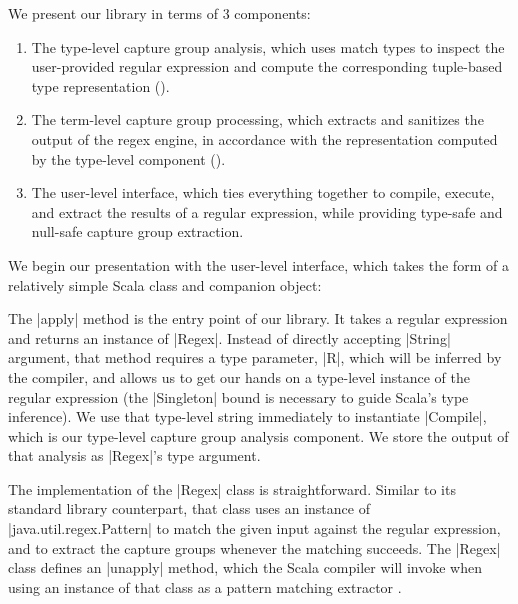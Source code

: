 We present our library in terms of 3 components:

\begin{enumerate}
  \item The type-level capture group analysis, which uses match types to inspect the user-provided regular expression and compute the corresponding tuple-based type representation ().

  \item The term-level capture group processing, which extracts and sanitizes the output of the regex engine, in accordance with the representation computed by the type-level component ().

  \item The user-level interface, which ties everything together to compile, execute, and extract the results of a regular expression, while providing type-safe and null-safe capture group extraction.
\end{enumerate}

We begin our presentation with the user-level interface, which takes the form of a relatively simple Scala class and companion object:

\regexUserLevel
%

The |apply| method is the entry point of our library.
It takes a regular expression and returns an instance of |Regex|.
Instead of directly accepting |String| argument, that method requires a type parameter, |R|, which will be inferred by the compiler, and allows us to get our hands on a type-level instance of the regular expression (the |Singleton| bound is necessary to guide Scala's type inference).
We use that type-level string immediately to instantiate |Compile|, which is our type-level capture group analysis component.
We store the output of that analysis as |Regex|'s type argument.

The implementation of the |Regex| class is straightforward.
Similar to its standard library counterpart, that class uses an instance of |java.util.regex.Pattern| to match the given input against the regular expression, and to extract the capture groups whenever the matching succeeds.
The |Regex| class defines an |unapply| method, which the Scala compiler will invoke when using an instance of that class as a pattern matching extractor \citep{emir2007matching}.

